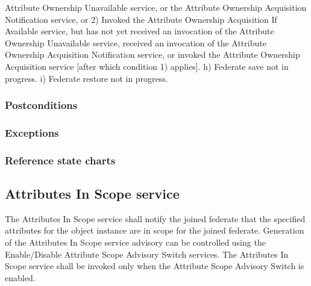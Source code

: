 \begin{compactstdpage}

    Attribute Ownership Unavailable \rtiinitiated{} service, or the Attribute Ownership Acquisition Notification \rtiinitiated{} service, or 2) Invoked the Attribute Ownership Acquisition If Available service, but has not yet received an invocation of the Attribute Ownership Unavailable \rtiinitiated{} service, received an invocation of the Attribute Ownership Acquisition Notification \rtiinitiated{} service, or invoked the Attribute Ownership Acquisition service [after which condition 1) applies]. h) Federate save not in progress. i) Federate restore not in progress.

    \subsubsection{Postconditions}



    \subsubsection{Exceptions}



    \subsubsection{Reference state charts}



    \subsection{Attributes In Scope \rtiinitiated{} service}


    The Attributes In Scope \rtiinitiated{} service shall notify the joined federate that the specified attributes for the object instance are in scope for the joined federate. Generation of the Attributes In Scope \rtiinitiated{} service advisory can be controlled using the Enable/Disable Attribute Scope Advisory Switch services. The Attributes In Scope \rtiinitiated{} service shall be invoked only when the Attribute Scope Advisory Switch is enabled.


\end{compactstdpage}
